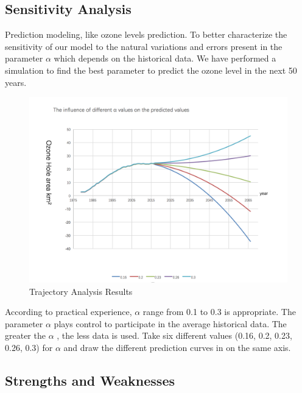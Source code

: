 \documentclass[12pt]{article}
\begin{document}
\subsection{Sensitivity Analysis}
Prediction modeling, like ozone levels prediction. To better characterize the sensitivity of our model to the natural variations and errors present in the parameter $\alpha$ which depends on the historical data. We have performed a simulation to find the best parameter to predict the ozone level in the next 50 years.
\begin{center}
\begin{figure}[htpb]
\centering
\includegraphics[scale=0.6]{ts}
\caption{Trajectory Analysis Results}\label{fig:xgxfx}
\end{figure}
\end{center}
According to practical experience, $\alpha$ range from 0.1 to 0.3 is appropriate. The parameter $\alpha$ plays control to participate in the average historical data. The greater the $\alpha$ , the less data is used. Take six different values (0.16, 0.2, 0.23, 0.26, 0.3) for $\alpha$ and draw the different prediction curves in on the same axis.
\subsection{Strengths and Weaknesses}
\end{document}
